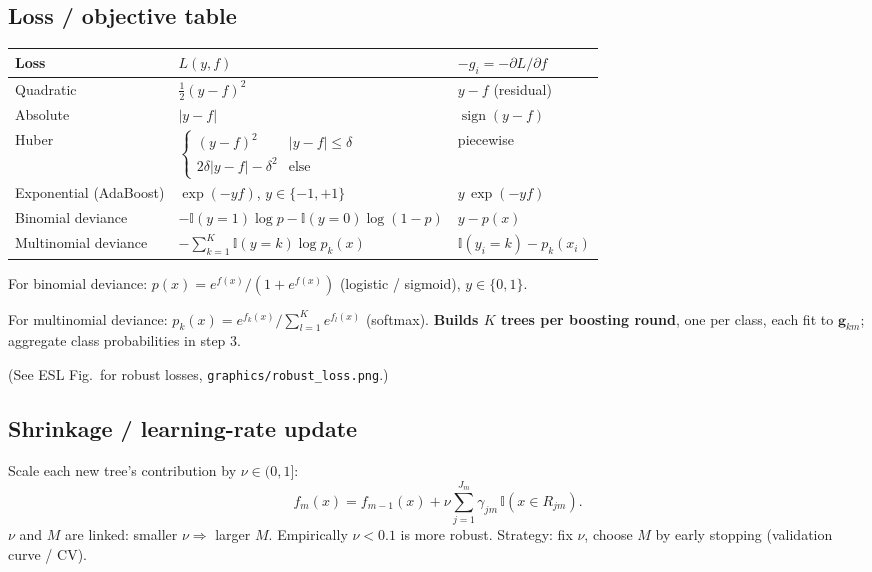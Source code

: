 \subsection{Loss / objective table}
\scriptsize
\begin{tabularx}{\linewidth}{@{}l X l@{}}
\toprule
Loss & $L(y,f)$ & $-g_i = -\partial L/\partial f$ \\
\midrule
Quadratic & $\tfrac12 (y-f)^2$ & $y-f$ (residual) \\
Absolute & $|y-f|$ & $\operatorname{sign}(y-f)$ \\
Huber & $\begin{cases}(y-f)^2 & |y-f|\le \delta\\ 2\delta|y-f|-\delta^2 & \text{else}\end{cases}$ & piecewise \\
Exponential (AdaBoost) & $\exp(-y f)$, $y\in\{-1,+1\}$ & $y\,\exp(-y f)$ \\
Binomial deviance & $-\mathbb{I}(y{=}1)\log p - \mathbb{I}(y{=}0)\log(1-p)$ & $y - p(x)$ \\
Multinomial deviance & $-\sum_{k=1}^K \mathbb{I}(y{=}k)\log p_k(x)$ & $\mathbb{I}(y_i{=}k) - p_k(x_i)$ \\
\bottomrule
\end{tabularx}
\normalsize

For binomial deviance: $p(x) = e^{f(x)}/(1+e^{f(x)})$ (logistic / sigmoid), $y\in\{0,1\}$.

For multinomial deviance: $p_k(x) = e^{f_k(x)} / \sum_{l=1}^K e^{f_l(x)}$ (softmax). \textbf{Builds $K$ trees per boosting round}, one per class, each fit to $\mathbf{g}_{km}$; aggregate class probabilities in step 3.

(See ESL Fig.\ for robust losses, \texttt{graphics/robust\_loss.png}.)

\subsection{Shrinkage / learning-rate update}
Scale each new tree's contribution by $\nu \in (0,1]$:
\[ f_m(x) = f_{m-1}(x) + \nu \sum_{j=1}^{J_m} \gamma_{jm}\, \mathbb{I}(x\in R_{jm}). \]
$\nu$ and $M$ are linked: smaller $\nu \Rightarrow$ larger $M$. Empirically $\nu < 0.1$ is more robust. Strategy: fix $\nu$, choose $M$ by early stopping (validation curve / CV).

